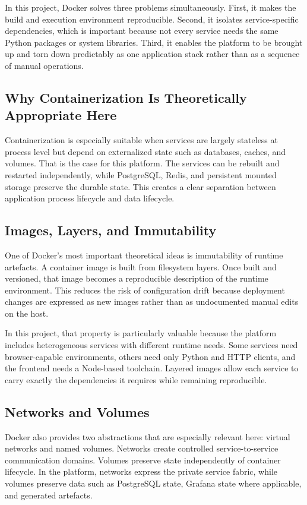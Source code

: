 In this project, Docker solves three problems simultaneously. First, it makes the build and execution environment reproducible. Second, it isolates service-specific dependencies, which is important because not every service needs the same Python packages or system libraries. Third, it enables the platform to be brought up and torn down predictably as one application stack rather than as a sequence of manual operations.

\subsection{Why Containerization Is Theoretically Appropriate Here}
Containerization is especially suitable when services are largely stateless at process level but depend on externalized state such as databases, caches, and volumes. That is the case for this platform. The services can be rebuilt and restarted independently, while PostgreSQL, Redis, and persistent mounted storage preserve the durable state. This creates a clear separation between application process lifecycle and data lifecycle.

\subsection{Images, Layers, and Immutability}
One of Docker's most important theoretical ideas is immutability of runtime artefacts. A container image is built from filesystem layers. Once built and versioned, that image becomes a reproducible description of the runtime environment. This reduces the risk of configuration drift because deployment changes are expressed as new images rather than as undocumented manual edits on the host.

In this project, that property is particularly valuable because the platform includes heterogeneous services with different runtime needs. Some services need browser-capable environments, others need only Python and HTTP clients, and the frontend needs a Node-based toolchain. Layered images allow each service to carry exactly the dependencies it requires while remaining reproducible.

\subsection{Networks and Volumes}
Docker also provides two abstractions that are especially relevant here: virtual networks and named volumes. Networks create controlled service-to-service communication domains. Volumes preserve state independently of container lifecycle. In the platform, networks express the private service fabric, while volumes preserve data such as PostgreSQL state, Grafana state where applicable, and generated artefacts.

